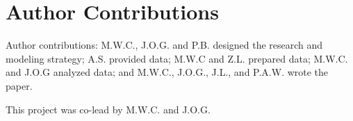 \documentclass[fleqn,10pt]{wlscirep}
\begin{document}


\section*{Author Contributions}
Author contributions: M.W.C., J.O.G. and P.B. designed the research and modeling strategy; A.S. provided data; M.W.C and Z.L. prepared data; M.W.C. and J.O.G analyzed data; and M.W.C., J.O.G., J.L., and P.A.W. wrote the paper.

\noindent This project was co-lead by M.W.C. and J.O.G.
\end{document}
